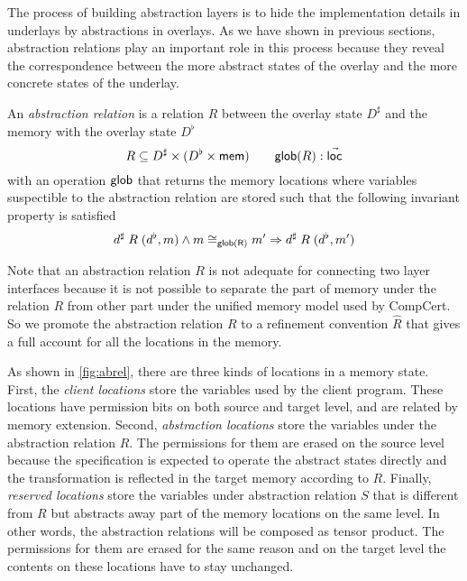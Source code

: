 \documentclass[acmsmall,review,anonymous]{acmart}\settopmatter{printfolios=true,printccs=false,printacmref=false}
\begin{document}
The process of building abstraction layers
is to hide the implementation details in underlays
by abstractions in overlays.
As we have shown in previous sections,
abstraction relations play an important role
in this process
because they reveal
the correspondence between
the more abstract states of the overlay
and the more concrete states of the underlay.

\begin{definition}
  An \emph{abstraction relation} is a relation $R$
  between the overlay state $D^\sharp$
  and the memory with the overlay state $D^\flat$
  \[
    R \subseteq D^\sharp \times (D^\flat \times  \mathsf{mem} )
    \qquad
     \mathsf{glob} (R): \vec{ \mathsf{loc} }
  \]
  with an operation $ \mathsf{glob} $ that returns
  the memory locations
  where variables suspectible to the abstraction relation
  are stored
  such that the following invariant property is satisfied
  \[
    d^\sharp \mathrel{R} (d^\flat, m) \wedge
    m \cong_{ \mathsf{glob(R)} } m' \Rightarrow
    d^\sharp \mathrel{R} (d^\flat, m')
  \]
\end{definition}



Note that an abstraction relation $R$
is not adequate for connecting two layer interfaces
because
it is not possible to separate
the part of memory under the relation $R$
from other part
under the unified memory model
used by CompCert.
So we promote the abstraction relation $R$
to a refinement convention $\hat{R}$
that gives a full account for
all the locations in the memory.

As shown in \autoref{fig:abrel},
there are three kinds of locations in a memory state.
First, the \emph{client locations} store the variables used
by the client program.
These locations have permission bits
on both source and target level,
and are related by memory extension.
Second, \emph{abstraction locations} store the variables
under the abstraction relation $R$.
The permissions for them are erased on the source level
because the specification is expected to
operate the abstract states directly
and the transformation is reflected
in the target memory according to $R$.
Finally, \emph{reserved locations} store the variables
under abstraction relation $S$
that is different from $R$
but abstracts away part of the memory locations
on the same level.
In other words, the abstraction relations
will be composed as tensor product.
The permissions for them are erased for the same reason
and on the target level the contents on these locations
have to stay unchanged.
\end{document}
